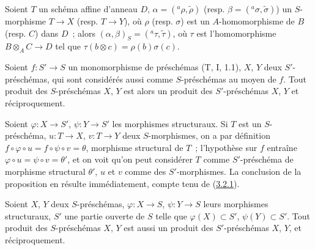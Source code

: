 \begin{corollary}[3.2.3]
\label{I.3.2.3-fr}
Soient $T$ un schéma affine d'anneau $D$,
$\alpha=({}^a\rho,\widetilde{\rho})$
(resp. $\beta=({}^a\sigma,\widetilde{\sigma})$) un $S$-morphisme $T\to X$
(resp. $T\to Y$), où $\rho$ (resp. $\sigma$) est un $A$-homomorphisme de $B$
(resp. $C$) dans $D$~; alors
$(\alpha,\beta)_S=({}^a\tau,\widetilde{\tau})$, où $\tau$ est l'homomorphisme
$B\otimes_A C\to D$ tel que $\tau(b\otimes c)=\rho(b)\sigma(c)$.
\end{corollary}

\begin{proposition}[3.2.4]
\label{I.3.2.4-fr}
Soient $f:S'\to S$ un monomorphisme de préschémas (T, I, 1.1), $X$, $Y$ deux
$S'$-préschémas, qui sont considérés aussi comme $S$-préschémas au moyen de
$f$. Tout produit des $S$-préschémas $X$, $Y$ est alors un produit des
$S'$-préschémas $X$, $Y$ et réciproquement.
\end{proposition}

Soient $\varphi:X\to S'$, $\psi:Y\to S'$ les morphismes structuraux. Si $T$
est un $S$-préschéma, $u:T\to X$, $v:T\to Y$ deux $S$-morphismes, on a par
définition $f\circ\varphi\circ u=f\circ\psi\circ v=\theta$, morphisme
structural de $T$~; l'hypothèse sur $f$ entraîne
$\varphi\circ u=\psi\circ v=\theta'$, et on voit qu'on peut considérer $T$
comme $S'$-préschéma de morphisme structural $\theta'$, $u$ et $v$ comme des
$S'$-morphismes. La conclusion de la proposition en résulte immédiatement,
compte tenu de (\hyperref[I.3.2.1-fr]{3.2.1}).

\begin{corollary}[3.2.5]
\label{I.3.2.5-fr}
Soient $X$, $Y$ deux $S$-préschémas, $\varphi:X\to S$, $\psi:Y\to S$ leurs
morphismes structuraux, $S'$ une partie ouverte de $S$ telle que
$\varphi(X)\subset S'$, $\psi(Y)\subset S'$. Tout produit des $S$-préschémas
$X$, $Y$ est aussi un produit des $S'$-préschémas $X$, $Y$, et réciproquement.
\end{corollary}

